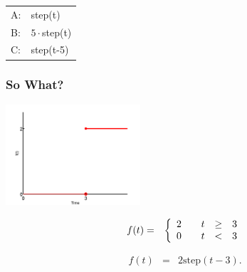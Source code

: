 {\begin{frame}
{     \vspace{2em}
     \begin{tabular}{ll}
       A: & step(t) \\ [12pt]
       B: & $5\cdot$step(t) \\ [12pt]
       C: & step(t-5)
     \end{tabular}

     \vfill
 }\fi
\end{frame}
}



\begin{frame}
  \frametitle{So What?}

  \centerline{\includegraphics[width=5cm]{img/stepEx1}}

  \begin{eqnarray*}
      f(t) & = & 
      \left\{
        \begin{array}{r@{\hspace{2em}}rcl}
          2 & t & \geq & 3 \\
          0 & t & < & 3
        \end{array}
      \right.
  \end{eqnarray*}

  {
    \begin{eqnarray*}
      f(t) & = & 2\mathrm{step}(t-3).
    \end{eqnarray*}
  }

\end{frame}


